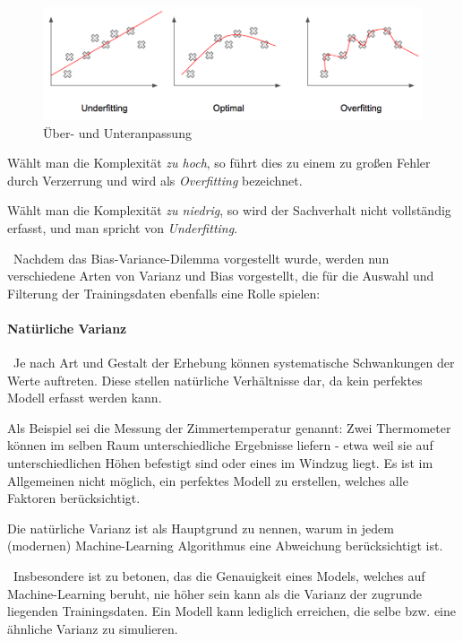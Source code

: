\begin{figure}[h]
	\begin{center}
		\includegraphics[width=0.6\linewidth]{Bilder/Overfitting}
		\caption[Über- und Unteranpassung: \newline \tiny \url{
			https://pythonmachinelearning.pro/a-guide-to-improving-deep-learnings-performance/} \normalsize]{Über- und Unteranpassung}
		\label{fig:Overfitting}
	\end{center}
\end{figure}

Wählt man die Komplexität \textit{zu hoch}, so führt dies zu einem zu großen Fehler durch Verzerrung und wird als \textit{Overfitting} bezeichnet. 

Wählt man die Komplexität \textit{zu niedrig}, so wird der Sachverhalt nicht vollständig erfasst, und man spricht von \textit{Underfitting}.

~\newline Nachdem das Bias-Variance-Dilemma vorgestellt wurde, werden nun verschiedene Arten von Varianz und Bias vorgestellt, die für die Auswahl und Filterung der Trainingsdaten ebenfalls eine Rolle spielen:
\paragraph{Natürliche Varianz} ~\newline Je nach Art und Gestalt der Erhebung können systematische Schwankungen der Werte auftreten. Diese stellen natürliche Verhältnisse dar, da kein perfektes Modell erfasst werden kann. 

Als Beispiel sei die Messung der Zimmertemperatur genannt: Zwei Thermometer können im selben Raum unterschiedliche Ergebnisse liefern - etwa weil sie auf unterschiedlichen Höhen befestigt sind oder eines im Windzug liegt. Es ist im Allgemeinen nicht möglich, ein perfektes Modell zu erstellen, welches alle Faktoren berücksichtigt.

Die natürliche Varianz ist als Hauptgrund zu nennen, warum in jedem (modernen) Machine-Learning Algorithmus eine Abweichung berücksichtigt ist.

~\newline Insbesondere ist  zu betonen, das die Genauigkeit eines Models, welches auf Machine-Learning beruht, nie höher sein kann als die Varianz der zugrunde liegenden Trainingsdaten. Ein Modell kann lediglich erreichen, die selbe bzw. eine ähnliche Varianz zu simulieren.

